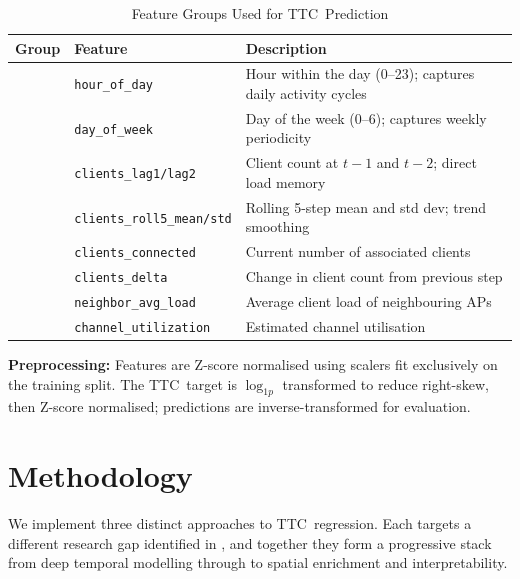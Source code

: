 \documentclass[12pt,a4paper]{article}
\newcommand{\code}[1]{\texttt{\small#1}}
\newcommand{\ttc}{\textsc{TTC}}
\begin{document}
\begin{table}[H]
\centering
\caption{Feature Groups Used for \ttc\ Prediction}
\label{tab:features}
\renewcommand{\arraystretch}{1.35}
\begin{tabular}{>{\bfseries}l l p{6.5cm}}
\toprule
\textbf{Group} & \textbf{Feature} & \textbf{Description} \\
\midrule
\multirow{4}{*}{\color{apblue}Temporal} 
 & \code{hour\_of\_day} & Hour within the day (0–23); captures daily activity cycles \\
 & \code{day\_of\_week} & Day of the week (0–6); captures weekly periodicity \\
 & \code{clients\_lag1/lag2} & Client count at $t{-}1$ and $t{-}2$; direct load memory \\
 & \code{clients\_roll5\_mean/std} & Rolling 5-step mean and std dev; trend smoothing \\
\midrule
\multirow{2}{*}{\color{aporange}Dynamic} 
 & \code{clients\_connected} & Current number of associated clients \\
 & \code{clients\_delta} & Change in client count from previous step \\
\midrule
\multirow{2}{*}{\color{apgreen}Spatial}
 & \code{neighbor\_avg\_load} & Average client load of neighbouring APs \\
 & \code{channel\_utilization} & Estimated channel utilisation \\
\bottomrule
\end{tabular}
\end{table}

\begin{notebox}
\textbf{Preprocessing:} Features are Z-score normalised using scalers fit exclusively on the training split. The \ttc\ target is $\log_{1p}$ transformed to reduce right-skew, then Z-score normalised; predictions are inverse-transformed for evaluation.
\end{notebox}

\section{Methodology}
\label{sec:methodology}

We implement three distinct approaches to \ttc\ regression. Each targets a different research gap identified in , and together they form a progressive stack from deep temporal modelling through to spatial enrichment and interpretability.
\end{document}
